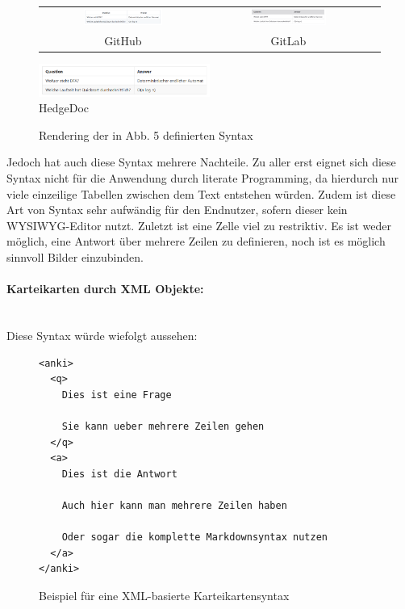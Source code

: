 \documentclass[ngerman]{article}
\begin{document}
\begin{figure}[H]
\centering
\begin{tabular}{ccc}
  \includegraphics[width=0.5\textwidth]{./figures/GH_Syntax3} &
  \includegraphics[width=0.5\textwidth]{./figures/GL_Syntax3}\\
GitHub & GitLab\\
\end{tabular}
  \includegraphics[width=0.5\textwidth]{./figures/HD_Syntax3} \\
  HedgeDoc
\caption{Rendering der in Abb. 5 definierten Syntax}
\end{figure}

Jedoch hat auch diese Syntax mehrere Nachteile. Zu aller erst eignet sich diese Syntax nicht für die Anwendung durch literate Programming, da hierdurch nur viele einzeilige Tabellen zwischen dem Text entstehen würden. Zudem ist diese Art von Syntax sehr aufwändig für den Endnutzer, sofern dieser kein WYSIWYG-Editor nutzt. Zuletzt ist eine Zelle viel zu restriktiv. Es ist weder möglich, eine Antwort über mehrere Zeilen zu definieren, noch ist es möglich sinnvoll Bilder einzubinden.

\paragraph{Karteikarten durch XML Objekte:}~\\
Diese Syntax würde wiefolgt aussehen:
\begin{figure}[H]
\centering
\begin{lstlisting}
<anki>
  <q>
    Dies ist eine Frage

    Sie kann ueber mehrere Zeilen gehen
  </q>
  <a>
    Dies ist die Antwort

    Auch hier kann man mehrere Zeilen haben

    Oder sogar die komplette Markdownsyntax nutzen
  </a>
</anki>
\end{lstlisting}
  \caption{Beispiel für eine XML-basierte Karteikartensyntax}
\end{figure}
\end{document}
